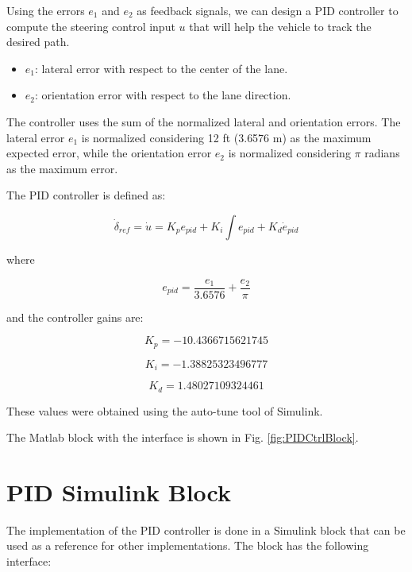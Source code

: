 \documentclass[12pt,a4paper]{cibb}
\begin{document}
Using the errors $e_1$ and $e_2$ as feedback signals, we can design a PID controller to compute the steering control input $u$ that will help the vehicle to track the desired path.

\begin{itemize}
  \item $e_1$: lateral error with respect to the center of the lane.
  \item $e_2$: orientation error with respect to the lane direction.
\end{itemize}

The controller uses the sum of the normalized lateral and orientation errors. The lateral error $e_1$ is normalized considering 12 ft (3.6576 m) as the maximum expected error, while the orientation error $e_2$ is normalized considering $\pi$ radians as the maximum error.

The PID controller is defined as:

\begin{equation} \label{eq:ctrl_PID}
\dot{\delta}_{ref} = \dot{u} =  K_{p}e_{pid} + K_{i}\int{e_{pid}} + K_{d}\dot{e}_{pid}
\end{equation}

where

\begin{equation}
 e_{pid} = \frac{e_{1}}{3.6576} + \frac{e_{2}}{\pi}
\end{equation}

and the controller gains are:

\begin{equation}
K_{p} = -10.4366715621745
\end{equation}

\begin{equation}
K_{i} = -1.38825323496777
\end{equation}

\begin{equation}
K_{d} = 1.48027109324461
\end{equation}

These values were obtained using the auto-tune tool of Simulink.

The Matlab block with the interface is shown in Fig. \ref{fig:PIDCtrlBlock}.


\section{PID Simulink Block}
\label{sec:Simulink}

The implementation of the PID controller is done in a Simulink block that can be used as a reference for other implementations. The block has the following interface:
\end{document}
